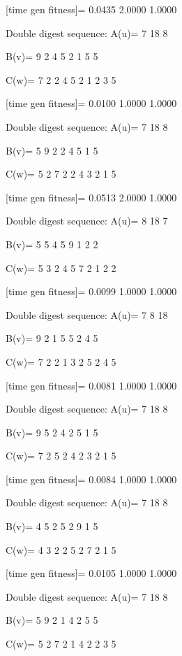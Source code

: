 [time gen fitness]=
    0.0435    2.0000    1.0000

Double digest sequence:
A(u)=
     7    18     8

B(v)=
     9     2     4     5     2     1     5     5

C(w)=
     7     2     2     4     5     2     1     2     3     5

[time gen fitness]=
    0.0100    1.0000    1.0000

Double digest sequence:
A(u)=
     7    18     8

B(v)=
     5     9     2     2     4     5     1     5

C(w)=
     5     2     7     2     2     4     3     2     1     5

[time gen fitness]=
    0.0513    2.0000    1.0000

Double digest sequence:
A(u)=
     8    18     7

B(v)=
     5     5     4     5     9     1     2     2

C(w)=
     5     3     2     4     5     7     2     1     2     2

[time gen fitness]=
    0.0099    1.0000    1.0000

Double digest sequence:
A(u)=
     7     8    18

B(v)=
     9     2     1     5     5     2     4     5

C(w)=
     7     2     2     1     3     2     5     2     4     5

[time gen fitness]=
    0.0081    1.0000    1.0000

Double digest sequence:
A(u)=
     7    18     8

B(v)=
     9     5     2     4     2     5     1     5

C(w)=
     7     2     5     2     4     2     3     2     1     5

[time gen fitness]=
    0.0084    1.0000    1.0000

Double digest sequence:
A(u)=
     7    18     8

B(v)=
     4     5     2     5     2     9     1     5

C(w)=
     4     3     2     2     5     2     7     2     1     5

[time gen fitness]=
    0.0105    1.0000    1.0000

Double digest sequence:
A(u)=
     7    18     8

B(v)=
     5     9     2     1     4     2     5     5

C(w)=
     5     2     7     2     1     4     2     2     3     5


